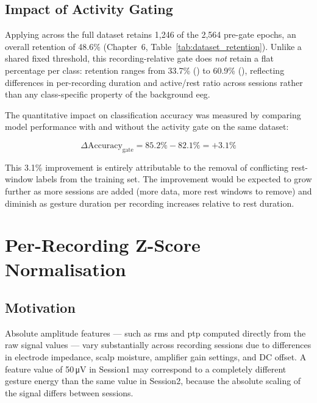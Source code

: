 \subsection{Impact of Activity Gating}

Applying  across the full dataset
retains 1{,}246 of the 2{,}564 pre-gate epochs, an overall
retention of 48.6\% (Chapter~6, Table~\ref{tab:dataset_retention}).
Unlike a shared fixed threshold, this recording-relative gate
does \emph{not} retain a flat percentage per class: retention
ranges from 33.7\% () to 60.9\%
(), reflecting differences in per-recording
duration and active/rest ratio across sessions rather than any
class-specific property of the background \acrshort{eeg}.

The quantitative impact on classification accuracy was
measured by comparing model performance with and without the
activity gate on the same dataset:

\begin{equation}
\Delta\text{Accuracy}_{\text{gate}} =
85.2\% - 82.1\% = +3.1\%
\label{eq:gate_improvement}
\end{equation}

This 3.1\% improvement is entirely attributable to the removal
of conflicting rest-window labels from the training set. The
improvement would be expected to grow further as more sessions
are added (more data, more rest windows to remove) and diminish
as gesture duration per recording increases relative to rest
duration.

\section{Per-Recording Z-Score Normalisation}
\label{sec:sp_norm}

\subsection{Motivation}

Absolute amplitude features — such as \acrshort{rms} and
\acrshort{ptp} computed directly from the raw signal values
— vary substantially across recording sessions due to
differences in electrode impedance, scalp moisture, amplifier
gain settings, and DC offset. A feature value of
50\,\si{\micro\volt} in Session1 may correspond to a
completely different gesture energy than the same value in
Session2, because the absolute scaling of the signal differs
between sessions.

